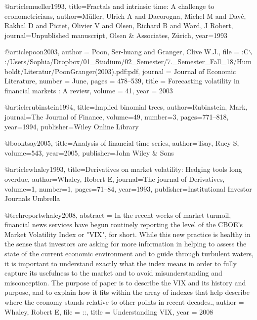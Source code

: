 @article{mueller1993,
  title={Fractals and intrinsic time: A challenge to econometricians},
  author={M{\"u}ller, Ulrich A and Dacorogna, Michel M and Dav{\'e}, Rakhal D and Pictet, Olivier V and Olsen, Richard B and Ward, J Robert},
  journal={Unpublished manuscript, Olsen \& Associates, Z{\"u}rich},
  year={1993}
}


@article{poon2003,
author = {Poon, Ser-huang and Granger, Clive W.J.},
file = {:C$\backslash$:/Users/Sophia/Dropbox/01{\_}Studium/02{\_}Semester/7.{\_}Semester{\_}Fall{\_}18/Humboldt/Literatur/PoonGranger(2003).pdf:pdf},
journal = {Journal of Economic Literature},
number = {June},
pages = {478--539},
title = {{Forecasting volatility in financial markets : A review}},
volume = {41},
year = {2003}
}

@article{rubinstein1994,
  title={Implied binomial trees},
  author={Rubinstein, Mark},
  journal={The Journal of Finance},
  volume={49},
  number={3},
  pages={771--818},
  year={1994},
  publisher={Wiley Online Library}
}

@book{tsay2005,
  title={Analysis of financial time series},
  author={Tsay, Ruey S},
  volume={543},
  year={2005},
  publisher={John Wiley \& Sons}
}

@article{whaley1993,
  title={Derivatives on market volatility: Hedging tools long overdue},
  author={Whaley, Robert E},
  journal={The journal of Derivatives},
  volume={1},
  number={1},
  pages={71--84},
  year={1993},
  publisher={Institutional Investor Journals Umbrella}
}

@techreport{whaley2008,
abstract = {In the recent weeks of market turmoil, financial news services have begun routinely reporting the level of the CBOE's Market Volatility Index or "VIX", for short. While this new practice is healthy in the sense that investors are asking for more information in helping to assess the state of the current economic environment and to guide through turbulent waters, it is important to understand exactly what the index means in order to fully capture its usefulness to the market and to avoid misunderstanding and misconception. The purpose of paper is to describe the VIX and its history and purpose, and to explain how it fits within the array of indexes that help describe where the economy stands relative to other points in recent decades.},
author = {Whaley, Robert E},
file = {::},
title = {{Understanding VIX}},
year = {2008}
}



